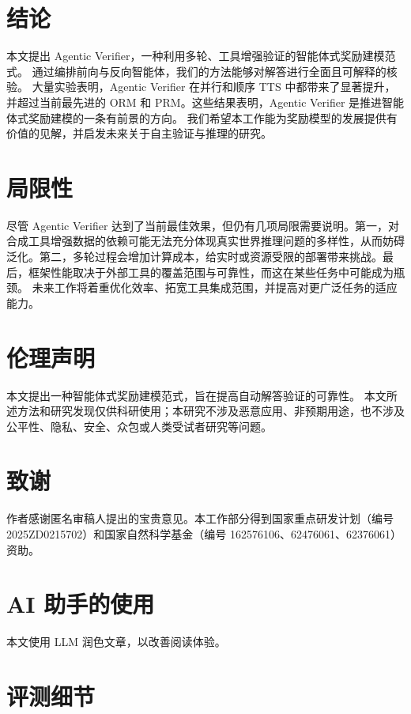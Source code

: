 \documentclass[11pt]{article}
\begin{document}
\section{结论}
本文提出 Agentic Verifier，一种利用多轮、工具增强验证的智能体式奖励建模范式。
通过编排前向与反向智能体，我们的方法能够对解答进行全面且可解释的核验。
大量实验表明，Agentic Verifier 在并行和顺序 TTS 中都带来了显著提升，并超过当前最先进的 ORM 和 PRM。这些结果表明，Agentic Verifier 是推进智能体式奖励建模的一条有前景的方向。
我们希望本工作能为奖励模型的发展提供有价值的见解，并启发未来关于自主验证与推理的研究。

\section{局限性}
尽管 Agentic Verifier 达到了当前最佳效果，但仍有几项局限需要说明。第一，对合成工具增强数据的依赖可能无法充分体现真实世界推理问题的多样性，从而妨碍泛化。第二，多轮过程会增加计算成本，给实时或资源受限的部署带来挑战。最后，框架性能取决于外部工具的覆盖范围与可靠性，而这在某些任务中可能成为瓶颈。
未来工作将着重优化效率、拓宽工具集成范围，并提高对更广泛任务的适应能力。

\section{伦理声明}
本文提出一种智能体式奖励建模范式，旨在提高自动解答验证的可靠性。
本文所述方法和研究发现仅供科研使用；本研究不涉及恶意应用、非预期用途，也不涉及公平性、隐私、安全、众包或人类受试者研究等问题。

\section*{致谢}
作者感谢匿名审稿人提出的宝贵意见。本工作部分得到国家重点研发计划（编号 2025ZD0215702）和国家自然科学基金（编号 162576106、62476061、62376061）资助。



\appendix

  

\section{AI 助手的使用}
本文使用 LLM 润色文章，以改善阅读体验。

\section{评测细节}
\label{sec:appendix_prompts}
\end{document}
